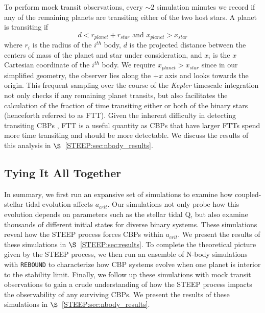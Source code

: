To perform mock transit observations, every ${\sim}2$ simulation minutes we record if any of the remaining planets are transiting either of the two host stars.  A planet is transiting if
\begin{equation} \label{eqn:transit}
d < r_{planet} + r_{star} \text{ and } x_{planet} > x_{star}
\end{equation}
where $r_{i}$ is the radius of the $i^{th}$ body, $d$ is the projected distance between the centers of mass of the planet and star under consideration, and $x_{i}$ is the $x$ Cartesian coordinate of the $i^{th}$ body.  We require $x_{planet} > x_{star}$ since in our simplified geometry, the observer lies along the $+x$ axis and looks towards the origin.  This frequent sampling over the course of the \textit{Kepler} timescale integration not only checks if any remaining planet transits, but also facilitates the calculation of the fraction of time transiting either or both of the binary stars (henceforth referred to as FTT).  Given the inherent difficulty in detecting transiting CBPs \citep[e.g.][]{Welsh2014,Winn2015}, FTT is a useful quantity as CBPs that have larger FTTs spend more time transiting and should be more detectable.  We discuss the results of this analysis in $\S$~\ref{STEEP:sec:nbody_results}.

\subsection{Tying It All Together}

In summary, we first run an expansive set of \vplanet simulations to examine how coupled-stellar tidal evolution affects $a_{crit}$.  Our simulations not only probe how this evolution depends on parameters such as the stellar tidal Q, but also examine thousands of different initial states for diverse binary systems.  These simulations reveal how the STEEP process forces CBPs within $a_{crit}$.  We present the results of these simulations in $\S$~\ref{STEEP:sec:results}.  To complete the theoretical picture given by the STEEP process, we then run an ensemble of N-body simulations with \texttt{REBOUND} to characterize how CBP systems evolve when one planet is interior to the stability limit.  Finally, we follow up these simulations with mock transit observations to gain a crude understanding of how the STEEP process impacts the observability of any surviving CBPs.  We present the results of these simulations in $\S$~\ref{STEEP:sec:nbody_results}.


